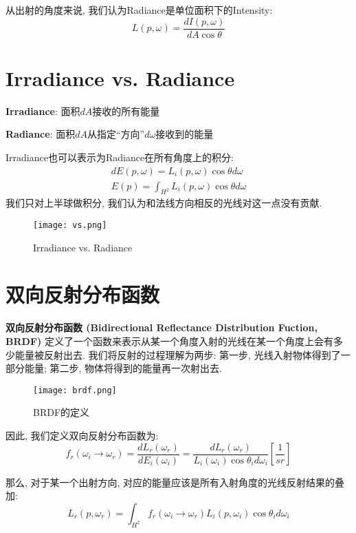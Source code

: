 从出射的角度来说, 我们认为Radiance是单位面积下的Intensity: 
\begin{equation}
		L(p,\omega)=\frac{dI(p,\omega)}{dA \cos\theta}
\end{equation}

\section{Irradiance vs. Radiance}
\textbf{Irradiance}: 面积$dA$接收的所有能量

\textbf{Radiance}: 面积$dA$从指定\enquote{方向}$d\omega$接收到的能量

Irradiance也可以表示为Radiance在所有角度上的积分: 
\begin{equation}
	\begin{split}
		dE(p,\omega)=L_i(p,\omega)\cos\theta d\omega\\
		E(p)=\int_{H^2}L_i(p,\omega)\cos\theta d\omega
	\end{split}
\end{equation}我们只对上半球做积分, 我们认为和法线方向相反的光线对这一点没有贡献. 

\begin{figure}[H]
	\centering
	\texttt{[image: vs.png]}
	\caption{Irradiance vs. Radiance}
	\label{fig:vs}
\end{figure}

\section{双向反射分布函数}
\textbf{双向反射分布函数 (Bidirectional Reflectance Distribution Fuction, BRDF) }定义了一个函数来表示从某一个角度入射的光线在某一个角度上会有多少能量被反射出去. 我们将反射的过程理解为两步: 第一步, 光线入射物体得到了一部分能量; 第二步, 物体将得到的能量再一次射出去. 

\begin{figure}[H]
	\centering
	\texttt{[image: brdf.png]}
	\caption{BRDF的定义}
	\label{fig:brdf}
\end{figure}

因此, 我们定义双向反射分布函数为: 
\begin{equation}
	f_r(\omega_i\rightarrow \omega_r)=\frac{dL_r(\omega_r)}{dE_i(\omega_i)}=\frac{dL_r(\omega_r)}{L_i(\omega_i)\cos\theta_i d\omega_i}[\frac{1}{sr}]
\end{equation}

那么, 对于某一个出射方向, 对应的能量应该是所有入射角度的光线反射结果的叠加: 
\begin{equation}
	L_r(p,\omega_r)=\int_{H^2}f_r(\omega_i\rightarrow \omega_r)L_i(p,\omega_i)\cos\theta_id\omega_i
\end{equation}

